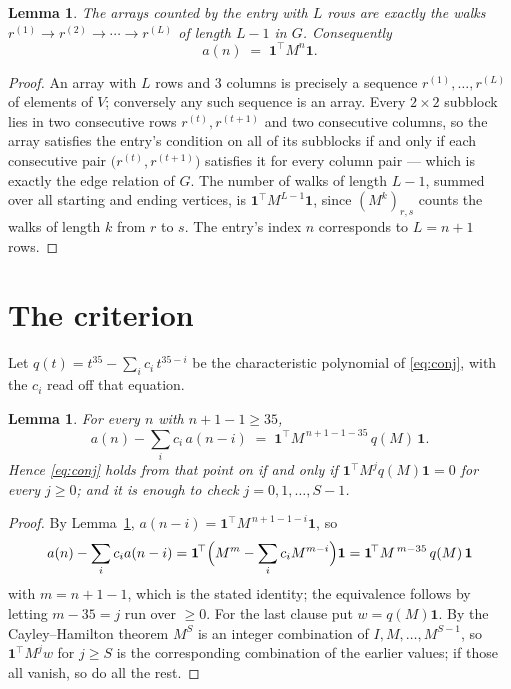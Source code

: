 \documentclass[11pt,a4paper]{article}
\theoremstyle{plain}
\newtheorem{lemma}[theorem]{Lemma}
\theoremstyle{definition}
\begin{document}
\begin{lemma}\label{lem:walk}
The arrays counted by the entry with $L$ rows are exactly the walks
$r^{(1)}\to r^{(2)}\to\cdots\to r^{(L)}$ of length $L-1$ in $G$. Consequently
\[
a(n)\;=\;\mathbf{1}^{\!\top}M^{n}\mathbf{1} .
\]
\end{lemma}

\begin{proof}
An array with $L$ rows and $3$ columns is precisely a sequence
$r^{(1)},\dots,r^{(L)}$ of elements of $V$; conversely any such sequence is an array.
Every $2\times2$ subblock lies in two consecutive rows $r^{(t)},r^{(t+1)}$ and two
consecutive columns, so the array satisfies the entry's condition on all of its subblocks
if and only if each consecutive pair $\bigl(r^{(t)},r^{(t+1)}\bigr)$ satisfies it for
every column pair --- which is exactly the edge relation of $G$. The number of walks of
length $L-1$, summed over all starting and ending vertices, is
$\mathbf{1}^{\!\top}M^{L-1}\mathbf{1}$, since $(M^{k})_{r,s}$ counts the walks of
length $k$ from $r$ to $s$. The entry's index $n$ corresponds to $L=n+1$ rows.
\end{proof}

\section{The criterion}

Let $q(t)=t^{35}-\sum_i c_i\,t^{35-i}$ be the characteristic polynomial of
\eqref{eq:conj}, with the $c_i$ read off that equation.

\begin{lemma}\label{lem:crit}
For every $n$ with $n+1-1\ge35$,
\[
a(n)-\sum_i c_i\,a(n-i)\;=\;\mathbf{1}^{\!\top}M^{\,n+1-1-35}\,q(M)\,\mathbf{1} .
\]
Hence \eqref{eq:conj} holds from that point on if and only if
$\mathbf{1}^{\!\top}M^{j}q(M)\mathbf{1}=0$ for every $j\ge0$; and it is enough to check
$j=0,1,\dots,S-1$.
\end{lemma}

\begin{proof}
By Lemma~\ref{lem:walk}, $a(n-i)=\mathbf{1}^{\!\top}M^{\,n+1-1-i}\mathbf{1}$, so
\[
a(n)-\sum_i c_i a(n-i)
=\mathbf{1}^{\!\top}\Bigl(M^{m}-\sum_i c_i M^{m-i}\Bigr)\mathbf{1}
=\mathbf{1}^{\!\top}M^{\,m-35}\,q(M)\,\mathbf{1}
\]
with $m=n+1-1$, which is the stated identity; the equivalence follows by letting
$m-35=j$ run over $\ge0$. For the last clause put $w=q(M)\mathbf{1}$. By the
Cayley--Hamilton theorem $M^{S}$ is an integer combination of $I,M,\dots,M^{S-1}$, so
$\mathbf{1}^{\!\top}M^{j}w$ for $j\ge S$ is the corresponding combination of the earlier
values; if those all vanish, so do all the rest.
\end{proof}
\end{document}
